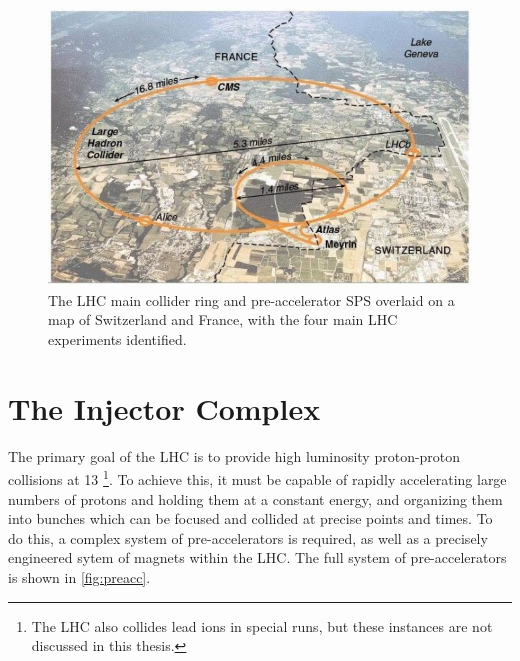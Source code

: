 \begin{centering}
\begin{figure}[!hbt]
\myfloatalign
\includegraphics[width=.90\linewidth]{figures/lhc/lhc-5-640x420.jpg}
\caption{The \ac{LHC} main collider ring and pre-accelerator \ac{SPS} overlaid on a map of Switzerland and France, with the four main \ac{LHC} experiments identified.}
\label{fig:lhc_map}
\end{figure}
\end{centering}


\section{The Injector Complex}
\label{sec:lhc_inj}

The primary goal of the \ac{LHC} is to provide high luminosity proton-proton collisions at 13 \tev\footnote{The \ac{LHC} also collides lead ions in special runs, but these instances are not discussed in this thesis.}. To achieve this, it must be capable of rapidly accelerating large numbers of protons and holding them at a constant energy, and organizing them into bunches which can be focused and collided at precise points and times. To do this, a complex system of pre-accelerators is required, as well as a precisely engineered sytem of magnets within the \ac{LHC}. The full system of pre-accelerators is shown in \autoref{fig:preacc}.

